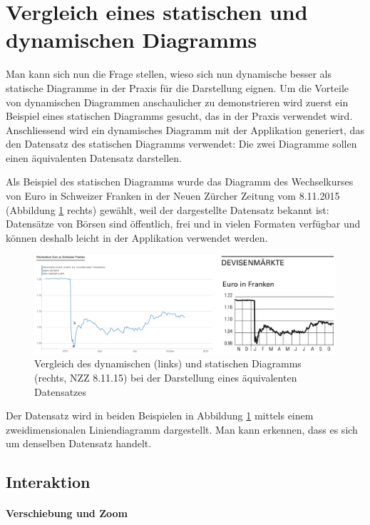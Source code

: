 \section{Vergleich eines statischen und dynamischen Diagramms}

Man kann sich nun die Frage stellen, wieso sich nun dynamische besser als statische Diagramme in der Praxis für die Darstellung eignen. Um die Vorteile von dynamischen Diagrammen anschaulicher zu demonstrieren wird zuerst ein Beispiel eines statischen Diagramms gesucht, das in der Praxis verwendet wird. Anschliessend wird ein dynamisches Diagramm mit der Applikation generiert, das den Datensatz des statischen Diagramms verwendet: Die zwei Diagramme sollen einen äquivalenten Datensatz darstellen.

Als Beispiel des statischen Diagramms wurde das Diagramm des Wechselkurses von Euro in Schweizer Franken in der Neuen Zürcher Zeitung vom 8.11.2015 (Abbildung \ref{fig:finance} rechts) gewählt, weil der dargestellte Datensatz bekannt ist: Datensätze von Börsen sind öffentlich, frei und in vielen Formaten verfügbar und können deshalb leicht in der Applikation verwendet werden.

\begin{figure}[H]
	\centering
	\includegraphics[width=\linewidth]{images/finance}
	\caption[Vergleich des dynamischen und statischen Diagramms]{Vergleich des dynamischen (links) und statischen Diagramms (rechts, NZZ 8.11.15) bei der Darstellung eines äquivalenten Datensatzes}
	\label{fig:finance}
\end{figure}

Der Datensatz wird in beiden Beispielen in Abbildung \ref{fig:finance} mittels einem zweidimensionalen Liniendiagramm dargestellt. Man kann erkennen, dass es sich um denselben Datensatz handelt.

\subsection{Interaktion}

\paragraph{Verschiebung und Zoom}

